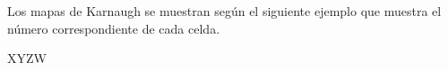     Los mapas de Karnaugh se muestran según el siguiente ejemplo que muestra el
    número correspondiente de cada celda.
    \begin{center}
      \begin{Karnaugh}{X}{Y}{Z}{W}
      \end{Karnaugh}
    \end{center}

    
    
    
    
    
    
    
